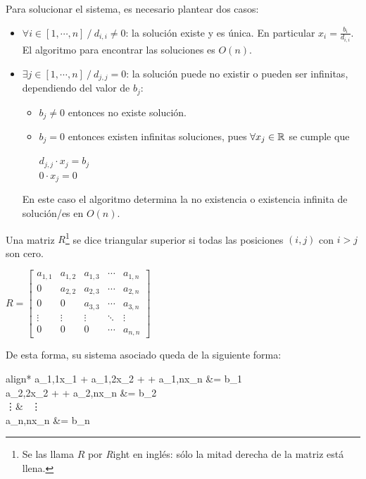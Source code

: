 \documentclass[]{article}
\begin{document}
Para solucionar el sistema, es necesario plantear dos casos:
\begin{itemize}
	\item $\forall i\in [1,\cdots,n]\ /\ d_{i,i}\neq 0$: la solución existe y es única. En particular $\displaystyle x_i = \frac{b_i}{d_{i,i}}$. El algoritmo para encontrar las soluciones es $O(n)$.
	\item $\exists j \in [1,\cdots,n]\ /\ d_{j,j}=0$: la solución puede no existir o pueden ser infinitas, dependiendo del valor de $b_j$:
	\begin{itemize}
		\item $b_j \neq 0$ entonces no existe solución.
		\item $b_j = 0$ entonces existen infinitas soluciones, pues $\forall x_j \in \mathbb{R}$ se cumple que
		\begin{center}
			$d_{j,j} \cdot x_j = b_j$\\
			$0 \cdot x_j = 0$
		\end{center}
	\end{itemize}
	En este caso el algoritmo determina la no existencia o existencia infinita de solución/es en $O(n)$.
\end{itemize}

Una matriz $R$\footnote{Se las llama $R$ por \emph{R}ight en inglés: sólo la mitad derecha de la matriz está llena.} se dice triangular superior si todas las posiciones $(i,j)$ con $i>j$ son cero.
\begin{center}
	$R=\begin{bmatrix}
		a_{1,1}&a_{1,2}&a_{1,3}&\cdots&a_{1,n}\\
		0&a_{2,2}&a_{2,3}&\cdots&a_{2,n}\\
		0&0&a_{3,3}&\cdots&a_{3,n}\\
		\vdots & \vdots & \vdots & \ddots & \vdots\\
		0&0&0&\cdots&a_{n,n}
	\end{bmatrix}$
\end{center}


De esta forma, su sistema asociado queda de la siguiente forma:
\begin{center}
	\begin{empheq}[left=S\eq \empheqlbrace]{align*}
	a_{1,1}\cdot x_1 + a_{1,2}\cdot x_2 + \cdots + a_{1,n}\cdot x_n &= b_1\\
	a_{2,2}\cdot x_2 + \cdots + a_{2,n}\cdot x_n &= b_2\\
	\vdots &\ \> \> \> \> \>  \vdots\\
	a_{n,n}\cdot x_n &= b_n
	\end{empheq}
\end{center}
\end{document}
